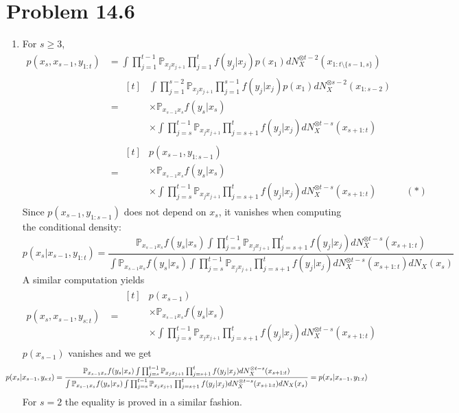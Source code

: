 \documentclass[a4paper,11pt, hidelinks]{article}
\begin{document}
\section*{Problem 14.6}
\begin{enumerate}[label=(\alph*)]
	\item For $s\geq 3$, $$\begin{aligned}
		p(x_s,x_{s-1},y_{1:t}) &= \int \prod_{j=1}^{t-1}\mathbb P_{x_{j} x_{j+1}} \prod_{j=1}^{t}f(y_j|x_j)p(x_1) dN_X^{\otimes t-2}(x_{1:t\setminus \{s-1,s\}}) \\
		&= \begin{aligned}[t]&\int \prod_{j=1}^{s-2}\mathbb P_{x_{j} x_{j+1}} \prod_{j=1}^{s-1}f(y_j|x_j)p(x_1) dN_X^{\otimes s-2}(x_{1:s-2}) \\
							& \times \mathbb P_{x_{s-1} x_s} f(y_s|x_s)\\
							& \times \int \prod_{j=s}^{t-1}\mathbb P_{x_{j} x_{j+1}} \prod_{j=s+1}^{t}f(y_j|x_j)dN_X^{\otimes t-s}(x_{s+1:t}) 
			\end{aligned}\\
		&= \begin{aligned}[t]& p(x_{s-1},y_{1:s-1}) \\
							& \times \mathbb P_{x_{s-1} x_s} f(y_s|x_s)\\
							& \times \int \prod_{j=s}^{t-1}\mathbb P_{x_{j} x_{j+1}} \prod_{j=s+1}^{t}f(y_j|x_j)dN_X^{\otimes t-s}(x_{s+1:t}) \quad \quad \quad (*)
			\end{aligned} 
	\end{aligned}$$
	Since $p(x_{s-1},y_{1:s-1})$ does not depend on $x_s$, it vanishes when computing the conditional density: $$p(x_s|x_{s-1},y_{1:t}) = \frac{\mathbb P_{x_{s-1} x_s} f(y_s|x_s) \int \prod_{j=s}^{t-1}\mathbb P_{x_{j} x_{j+1}} \prod_{j=s+1}^{t}f(y_j|x_j)dN_X^{\otimes t-s}(x_{s+1:t})}{\int \mathbb P_{x_{s-1} x_s} f(y_s|x_s) \int \prod_{j=s}^{t-1}\mathbb P_{x_{j} x_{j+1}} \prod_{j=s+1}^{t}f(y_j|x_j)dN_X^{\otimes t-s}(x_{s+1:t}) dN_X(x_s)}$$
	A similar computation yields 
	$$\begin{aligned}
		p(x_s,x_{s-1},y_{s:t}) &= \begin{aligned}[t]& p(x_{s-1}) \\
							& \times \mathbb P_{x_{s-1} x_s} f(y_s|x_s)\\
							& \times \int \prod_{j=s}^{t-1}\mathbb P_{x_{j} x_{j+1}} \prod_{j=s+1}^{t}f(y_j|x_j)dN_X^{\otimes t-s}(x_{s+1:t}) 
			\end{aligned}
	\end{aligned}$$
	$p(x_{s-1})$ vanishes and we get $$\hspace{-0.8cm}p(x_s|x_{s-1},y_{s:t}) = \frac{\mathbb P_{x_{s-1} x_s} f(y_s|x_s) \int \prod_{j=s}^{t-1}\mathbb P_{x_{j} x_{j+1}} \prod_{j=s+1}^{t}f(y_j|x_j)dN_X^{\otimes t-s}(x_{s+1:t})}{\int \mathbb P_{x_{s-1} x_s} f(y_s|x_s) \int \prod_{j=s}^{t-1}\mathbb P_{x_{j} x_{j+1}} \prod_{j=s+1}^{t}f(y_j|x_j)dN_X^{\otimes t-s}(x_{s+1:t}) dN_X(x_s)} = p(x_s|x_{s-1},y_{1:t})$$
	For $s=2$ the equality is proved in a similar fashion.


\end{enumerate}
\end{document}
